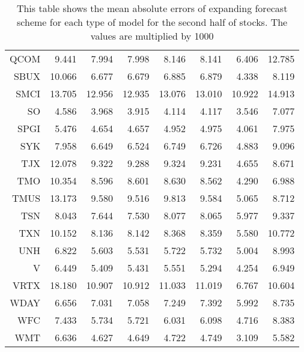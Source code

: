 \begin{table}[ht]
\begin{tabular}{rrrrrrrr}
  QCOM & 9.441 & 7.994 & 7.998 & 8.146 & 8.141 & 6.406 & 12.785 \\ 
  SBUX & 10.066 & 6.677 & 6.679 & 6.885 & 6.879 & 4.338 & 8.119 \\ 
  SMCI & 13.705 & 12.956 & 12.935 & 13.076 & 13.010 & 10.922 & 14.913 \\ 
  SO & 4.586 & 3.968 & 3.915 & 4.114 & 4.117 & 3.546 & 7.077 \\ 
  SPGI & 5.476 & 4.654 & 4.657 & 4.952 & 4.975 & 4.061 & 7.975 \\ 
  SYK & 7.958 & 6.649 & 6.524 & 6.749 & 6.726 & 4.883 & 9.096 \\ 
  TJX & 12.078 & 9.322 & 9.288 & 9.324 & 9.231 & 4.655 & 8.671 \\ 
  TMO & 10.354 & 8.596 & 8.601 & 8.630 & 8.562 & 4.290 & 6.988 \\ 
  TMUS & 13.173 & 9.580 & 9.516 & 9.813 & 9.584 & 5.065 & 8.712 \\ 
  TSN & 8.043 & 7.644 & 7.530 & 8.077 & 8.065 & 5.977 & 9.337 \\ 
  TXN & 10.152 & 8.136 & 8.142 & 8.368 & 8.359 & 5.580 & 10.772 \\ 
  UNH & 6.822 & 5.603 & 5.531 & 5.722 & 5.732 & 5.004 & 8.993 \\ 
  V & 6.449 & 5.409 & 5.431 & 5.551 & 5.294 & 4.254 & 6.949 \\ 
  VRTX & 18.180 & 10.907 & 10.912 & 11.033 & 11.019 & 6.767 & 10.604 \\ 
  WDAY & 6.656 & 7.031 & 7.058 & 7.249 & 7.392 & 5.992 & 8.735 \\ 
  WFC & 7.433 & 5.734 & 5.721 & 6.031 & 6.098 & 4.716 & 8.383 \\ 
  WMT & 6.636 & 4.627 & 4.649 & 4.722 & 4.749 & 3.109 & 5.582 \\ 
   \hline
\end{tabular}
\caption[MAE expanding forecast (2)]{This table shows the mean absolute errors of expanding forecast scheme for each type of model for the second half of stocks. 
                     The values are multiplied by 1000} 
\label{Table:MAE_e_2}
\end{table}
